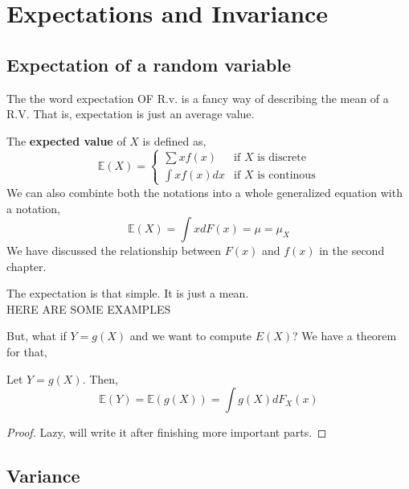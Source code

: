 \chapter{Expectations and Invariance}
\section{Expectation of a random variable}
The the word expectation OF R.v. is a fancy way of describing the mean of a R.V. That is, expectation is just an average value.
\begin{definition}
    The \textbf{expected value} of $X$ is defined as,
    \[\mathbb{E}(X)= \begin{cases}
        \sum xf(x)& \text{if $X$ is discrete} \\
        \int xf(x)dx &\text{if $X$ is continous}
    \end{cases}\]
    We can also combinte both the notations into a whole generalized equation with a notation,
    \[\mathbb{E}(X) = \int x dF(x)= \mu = \mu_X\]
    We have discussed the relationship between $F(x)$ and $f(x)$ in the second chapter.
\end{definition}
The expectation is that simple. It is just a mean.\\
HERE ARE SOME EXAMPLES
\lipsum[1-3]
\par
\vspace{10cm}
But, what if $Y= g(X)$ and we want to compute $E(X)$? We have a theorem for that,
\begin{theorem}
    Let $Y = g(X)$. Then,
    \[\mathbb{E}(Y)= \mathbb{E}(g(X))= \int g(X) dF_X(x)\]
    \begin{proof}
       Lazy, will write it after finishing more important parts.
    \end{proof}
\end{theorem}
\section{Variance}